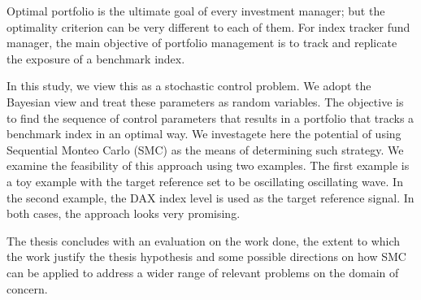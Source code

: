 


\begin{abstracts}        %
  Optimal portfolio is the ultimate goal of every investment manager; but the optimality criterion can be very different to each of them. For index tracker fund manager, the main objective of portfolio management is to track and replicate the exposure of a benchmark index.

In this study, we view this as a stochastic control problem. We adopt the Bayesian view and treat these parameters as random variables. The objective is to find the sequence of control parameters that results in a portfolio that tracks a benchmark index in an optimal way. We investagete here the potential of using Sequential Monteo Carlo (SMC) as the means of determining such strategy. We examine the feasibility of this approach using two examples. The first example is a toy example with the target reference set to be oscillating  oscillating wave. In the second example, the DAX index level is used as the target reference signal. In both cases, the approach looks very promising.

  The thesis concludes with an evaluation on the work done, the extent
  to which the work justify the thesis hypothesis and some possible
  directions on how SMC can be applied to address
  a wider range of relevant problems on the domain of concern.
\end{abstracts}




